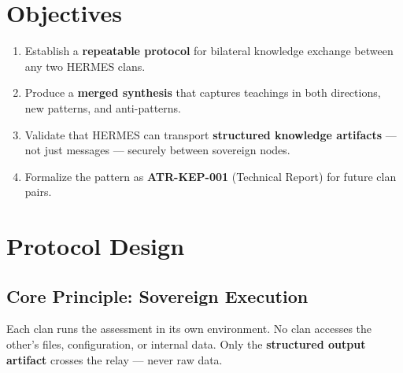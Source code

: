 \documentclass[11pt,a4paper]{article}
\begin{document}
\section{Objectives}

\begin{enumerate}
  \item Establish a \textbf{repeatable protocol} for bilateral knowledge
    exchange between any two HERMES clans.
  \item Produce a \textbf{merged synthesis} that captures teachings in both
    directions, new patterns, and anti-patterns.
  \item Validate that HERMES can transport \textbf{structured knowledge
    artifacts} --- not just messages --- securely between sovereign nodes.
  \item Formalize the pattern as \textbf{ATR-KEP-001} (Technical Report)
    for future clan pairs.
\end{enumerate}

\section{Protocol Design}

\subsection{Core Principle: Sovereign Execution}

Each clan runs the assessment in its own environment. No clan accesses
the other's files, configuration, or internal data. Only the
\textbf{structured output artifact} crosses the relay --- never raw data.
\end{document}
